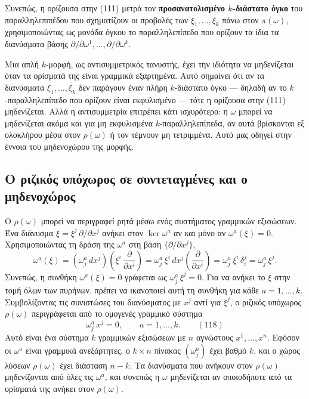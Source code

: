 \documentclass[12pt]{article}
\begin{document}
Συνεπώς, η ορίζουσα στην (111) μετρά τον \textbf{προσανατολισμένο $k$-διάστατο όγκο} του παραλληλεπιπέδου που σχηματίζουν οι προβολές των $\xi_1, \dots, \xi_k$ πάνω στον $\pi(\omega)$, χρησιμοποιώντας ως μονάδα όγκου το παραλληλεπίπεδο που ορίζουν τα ίδια τα διανύσματα βάσης $\partial / \partial \omega^1, \dots, \partial / \partial \omega^k$.

Μια απλή $k$-μορφή, ως αντισυμμετρικός τανυστής, έχει την ιδιότητα να μηδενίζεται όταν τα ορίσματά της είναι γραμμικά εξαρτημένα. Αυτό σημαίνει ότι αν τα διανύσματα $\xi_1, \dots, \xi_k$ δεν παράγουν έναν πλήρη $k$-διάστατο όγκο — δηλαδή αν το $k$-παραλληλεπίπεδο που ορίζουν είναι εκφυλισμένο — τότε η ορίζουσα στην (111) μηδενίζεται. Αλλά η αντισυμμετρία επιτρέπει κάτι ισχυρότερο: η $\omega$ μπορεί να μηδενίζεται ακόμα και για μη εκφυλισμένα $k$-παραλληλεπίπεδα, αν αυτά βρίσκονται εξ ολοκλήρου μέσα στον $\rho(\omega)$ ή τον τέμνουν μη τετριμμένα. Αυτό μας οδηγεί στην έννοια του μηδενοχώρου της μορφής.

\subsection{Ο ριζικός υπόχωρος σε συντεταγμένες και ο μηδενοχώρος}

Ο $\rho(\omega)$ μπορεί να περιγραφεί ρητά μέσω ενός συστήματος γραμμικών εξισώσεων. Ένα διάνυσμα $\xi = \xi^j \, \partial / \partial x^j$ ανήκει στον $\ker \omega^a$ αν και μόνο αν $\omega^a(\xi) = 0$. Χρησιμοποιώντας τη δράση της $\omega^a$ στη βάση $\{\partial / \partial x^j\}$,
\[
\omega^a(\xi) = (\omega^a_j \, dx^j) \left( \xi^i \, \frac{\partial}{\partial x^i} \right) = \omega^a_j \, \xi^i \, dx^j \left( \frac{\partial}{\partial x^i} \right) = \omega^a_j \, \xi^i \, \delta^j_i = \omega^a_j \, \xi^j.
\]
Συνεπώς, η συνθήκη $\omega^a(\xi) = 0$ γράφεται ως $\omega^a_j \, \xi^j = 0$. Για να ανήκει το $\xi$ στην τομή όλων των πυρήνων, πρέπει να ικανοποιεί αυτή τη συνθήκη για κάθε $a = 1, \dots, k$. Συμβολίζοντας τις συνιστώσες του διανύσματος με $x^j$ αντί για $\xi^j$, ο ριζικός υπόχωρος $\rho(\omega)$ περιγράφεται από το ομογενές γραμμικό σύστημα
\begin{equation}
\omega^a_j \, x^j = 0, \qquad a = 1, \dots, k. \qquad (118)
\end{equation}
Αυτό είναι ένα σύστημα $k$ γραμμικών εξισώσεων με $n$ αγνώστους $x^1, \dots, x^n$. Εφόσον οι $\omega^a$ είναι γραμμικά ανεξάρτητες, ο $k \times n$ πίνακας $(\omega^a_j)$ έχει βαθμό $k$, και ο χώρος λύσεων $\rho(\omega)$ έχει διάσταση $n-k$. Τα διανύσματα που ανήκουν στον $\rho(\omega)$ μηδενίζονται από όλες τις $\omega^a$, και συνεπώς η $\omega$ μηδενίζεται αν οποιοδήποτε από τα ορίσματά της ανήκει στον $\rho(\omega)$.
\end{document}
